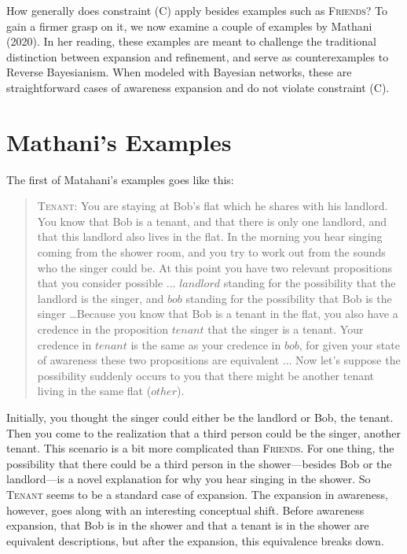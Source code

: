 \documentclass[
  11pt,
  dvipsnames,enabledeprecatedfontcommands]{scrartcl}
\begin{document}
How generally does constraint (C) apply besides examples such as
\textsc{Friends}? To gain a firmer grasp on it, we now examine a couple
of examples by Mathani (2020). In her reading, these examples are meant
to challenge the traditional distinction between expansion and
refinement, and serve as counterexamples to Reverse Bayesianism. When
modeled with Bayesian networks, these are straightforward cases of
awareness expansion and do not violate constraint (C).

\hypertarget{mathanis-examples}{%
\section{Mathani's Examples}\label{mathanis-examples}}

The first of Matahani's examples goes like this:

\begin{quote}
\textsc{Tenant}: You are staying at Bob's flat which he shares with his landlord. You know that Bob is a tenant, and that there is only one landlord, and that this landlord also lives in the flat. In the morning you hear singing coming from the shower room, and you try to work out from the sounds who the singer could be. At this point you have two relevant propositions that you consider possible ... $landlord$ standing for the possibility that the landlord is the singer, and $bob$ standing for the possibility that Bob is the singer  \dots  Because you know that Bob is a tenant in the flat, you also have a credence in the proposition $tenant$ that the singer is a tenant. Your credence in $tenant$ is the same as your credence in $bob$, for given your state of awareness these two propositions are equivalent ... Now let's suppose the possibility suddenly occurs to you that there might be another tenant living in the same flat  ($other$).
\end{quote}

\doublespace

\noindent Initially, you thought the singer could either be the landlord
or Bob, the tenant. Then you come to the realization that a third person
could be the singer, another tenant. This scenario is a bit more
complicated than \textsc{Friends}. For one thing, the possibility that
there could be a third person in the shower---besides Bob or the
landlord---is a novel explanation for why you hear singing in the
shower. So \textsc{Tenant} seems to be a standard case of expansion. The
expansion in awareness, however, goes along with an interesting
conceptual shift. Before awareness expansion, that Bob is in the shower
and that a tenant is in the shower are equivalent descriptions, but
after the expansion, this equivalence breaks down.
\end{document}
